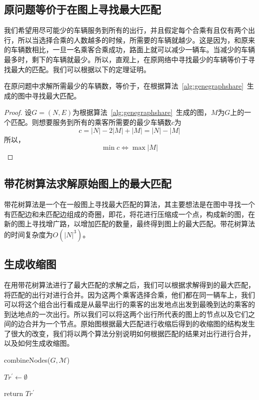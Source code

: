 \subsection{原问题等价于在图上寻找最大匹配}
我们希望用尽可能少的车辆服务到所有的出行，并且假定每个合乘有且仅有两个出行，所以当选择合乘的人数越多的时候，所需要的车辆就越少。这是因为，和原来的车辆数相比，一旦一名乘客合乘成功，路面上就可以减少一辆车。当减少的车辆最多时，剩下的车辆就最少。所以，直观上，在原网络中寻找最少的车辆等价于寻找最大的匹配。我们可以根据以下的定理证明。
\begin{theorem}
在原问题中求解所需最少的车辆数，等价于，在根据算法~\ref{alg:genegraphshare}~生成的图中寻找最大匹配。
\end{theorem}
\begin{proof}
设$G = (N, E)$为根据算法~\ref{alg:genegraphshare}~生成的图，$M$为$G$上的一个匹配。则想要服务到所有的乘客所需要的最少车辆数$c$为
\begin{equation}
c = |N|-2|M|+|M| = |N|-|M|
\end{equation}
所以，
\[
  \min c \Longleftrightarrow \max |M|
\]
\end{proof}

\subsection{带花树算法求解原始图上的最大匹配}
带花树算法是一个在一般图上寻找最大匹配的算法，其主要想法是在图中寻找一个有匹配边和未匹配边组成的奇圈，即花，将花进行压缩成一个点，构成新的图，在新的图上寻找增广路，以增加匹配的数量，最终得到图上的最大匹配。带花树算法的时间复杂度为$O(|N|^3)$。

\subsection{生成收缩图}
在用带花树算法进行了最大匹配的求解之后，我们可以根据求解得到的最大匹配，将匹配的出行对进行合并。因为这两个乘客选择合乘，他们都在同一辆车上，我们可以将这个组合出行看成是从最早出行的乘客的出发地点出发到最晚到达的乘客的到达地点的一次出行。所以我们可以将这两个出行所代表的图上的节点以及它们之间的边合并为一个节点。原始图根据最大匹配进行收缩后得到的收缩图的结构发生了很大的改变，我们将以两个算法分别说明如何根据匹配的结果对出行进行合并，以及如何生成收缩图。

\begin{algorithm}[htbp]
\SetAlgoLined
{}
\caption{combineNodes($G,\mathcal{M}$)}
\label{alg:combnode}
\BlankLine
$Tr^\prime \leftarrow \emptyset$\;

return $Tr^\prime$\;
\end{algorithm}

